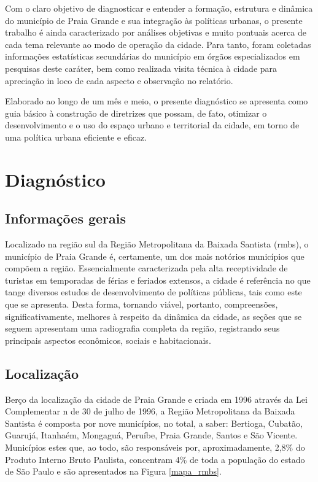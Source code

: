 	Com o claro objetivo de diagnosticar e entender a formação, estrutura e dinâmica do município de Praia Grande e sua integração às políticas urbanas, o presente trabalho é ainda caracterizado por análises objetivas e muito pontuais acerca de cada tema relevante ao modo de operação da cidade. Para tanto, foram coletadas informações estatísticas secundárias do município em órgãos especializados em pesquisas deste caráter, bem como realizada visita técnica à cidade para apreciação in loco de cada aspecto e observação no relatório.
	
	Elaborado ao longo de um mês e meio, o presente diagnóstico se apresenta como guia básico à construção de diretrizes que possam, de fato, otimizar o desenvolvimento e o uso do espaço urbano e territorial da cidade, em torno de uma política urbana eficiente e eficaz.
	
	
	\chapter{Diagnóstico} \label{diag}
		
	\section{Informações gerais}
	
	Localizado na região sul da Região Metropolitana da Baixada Santista (\gls{rmbs}), o município de Praia Grande é, certamente, um dos mais notórios municípios que compõem a região. Essencialmente caracterizada pela alta receptividade de turistas em temporadas de férias e feriados extensos, a cidade é referência no que tange diversos estudos de desenvolvimento de políticas públicas, tais como este que se apresenta. Desta forma, tornando viável, portanto, compreensões, significativamente, melhores à respeito da dinâmica da cidade, as seções que se seguem apresentam uma radiografia completa da região, registrando seus principais aspectos econômicos, sociais e habitacionais.
	
	\section{Localização}
	
	Berço da localização da cidade de Praia Grande e criada em 1996 através da Lei Complementar n de 30 de julho de 1996, a Região Metropolitana da Baixada Santista é composta por nove municípios, no total, a saber: Bertioga, Cubatão, Guarujá, Itanhaém, Mongaguá, Peruíbe, Praia Grande, Santos e São Vicente. Municípios estes que, ao todo, são responsáveis por, aproximadamente, 2,8\% do Produto Interno Bruto Paulista, concentram 4\% de toda a população do estado de São Paulo e são apresentados na Figura \ref{mapa_rmbs}.
	
